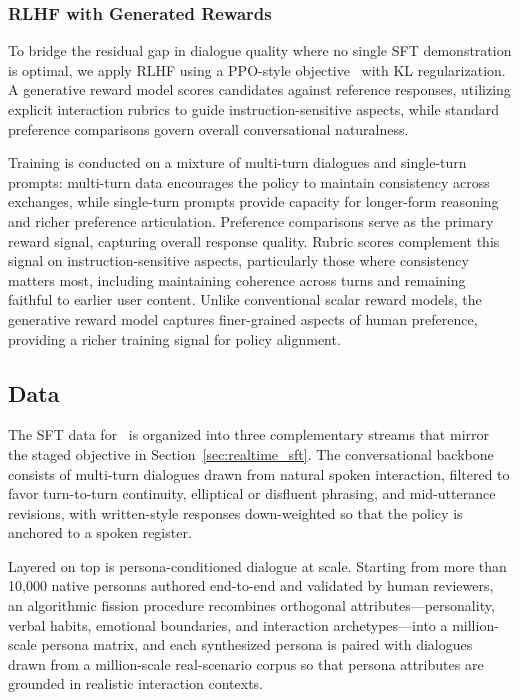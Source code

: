 \subsubsection{RLHF with Generated Rewards}
To bridge the residual gap in dialogue quality where no single SFT demonstration is optimal, we apply RLHF using a PPO-style objective~\citep{schulman2017proximal} with KL regularization. A generative reward model scores candidates against reference responses, utilizing explicit interaction rubrics to guide instruction-sensitive aspects, while standard preference comparisons govern overall conversational naturalness.

Training is conducted on a mixture of multi-turn dialogues and single-turn prompts: multi-turn data encourages the policy to maintain consistency across exchanges, while single-turn prompts provide capacity for longer-form reasoning and richer preference articulation. Preference comparisons serve as the primary reward signal, capturing overall response quality. Rubric scores complement this signal on instruction-sensitive aspects, particularly those where consistency matters most, including maintaining coherence across turns and remaining faithful to earlier user content. Unlike conventional scalar reward models, the generative reward model captures finer-grained aspects of human preference, providing a richer training signal for policy alignment.

\subsection{Data}
The SFT data for \steprealtime\ is organized into three complementary streams that mirror the staged objective in Section~\ref{sec:realtime_sft}. The conversational backbone consists of multi-turn dialogues drawn from natural spoken interaction, filtered to favor turn-to-turn continuity, elliptical or disfluent phrasing, and mid-utterance revisions, with written-style responses down-weighted so that the policy is anchored to a spoken register.

Layered on top is persona-conditioned dialogue at scale. Starting from more than 10{,}000 native personas authored end-to-end and validated by human reviewers, an algorithmic fission procedure recombines orthogonal attributes—personality, verbal habits, emotional boundaries, and interaction archetypes—into a million-scale persona matrix, and each synthesized persona is paired with dialogues drawn from a million-scale real-scenario corpus so that persona attributes are grounded in realistic interaction contexts.

